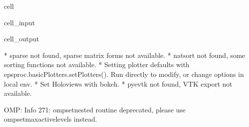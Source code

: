 \documentclass[letterpaper,table,10pt,english]{jupyterBook}
\begin{document}
\begin{sphinxuseclass}{cell}\begin{sphinxVerbatimInput}

\begin{sphinxuseclass}{cell_input}
\begin{sphinxVerbatim}[commandchars=\\\{\}]
 
\PYG{p}{[}   \PYG{p}{]}
\end{sphinxVerbatim}

\end{sphinxuseclass}\end{sphinxVerbatimInput}
\begin{sphinxVerbatimOutput}

\begin{sphinxuseclass}{cell_output}
\begin{sphinxVerbatim}[commandchars=\\\{\}]
* sparse not found, sparse matrix forms not available. 
* natsort not found, some sorting functions not available. 
* Setting plotter defaults with epsproc.basicPlotters.setPlotters(). Run directly to modify, or change options in local env.
* Set Holoviews with bokeh.
* pyevtk not found, VTK export not available. 
\end{sphinxVerbatim}

\begin{sphinxVerbatim}[commandchars=\\\{\}]
OMP: Info \PYGZsh{}271: omp\PYGZus{}set\PYGZus{}nested routine deprecated, please use omp\PYGZus{}set\PYGZus{}max\PYGZus{}active\PYGZus{}levels instead.
\end{sphinxVerbatim}


\end{sphinxuseclass}
\end{sphinxVerbatimOutput}
\end{sphinxuseclass}
\end{document}
